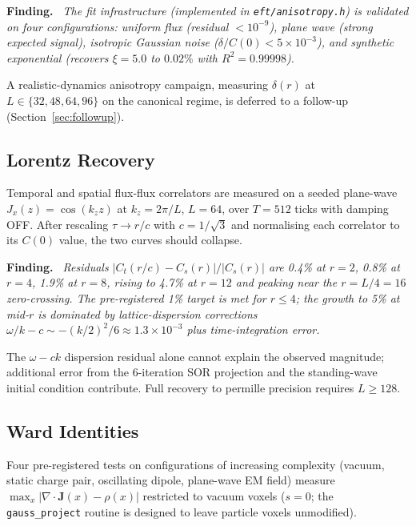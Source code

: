 \documentclass[11pt,letterpaper]{article}
\newenvironment{finding}{\par\medskip\noindent\textbf{Finding.}\itshape\ }{\par\medskip}
\begin{document}
\begin{finding}
The fit infrastructure (implemented in \texttt{eft/anisotropy.h}) is
validated on four configurations: uniform flux (residual $< 10^{-9}$),
plane wave (strong expected signal), isotropic Gaussian noise
($\delta/C(0) < 5\times 10^{-3}$), and synthetic exponential
(recovers $\xi = 5.0$ to $0.02\%$ with $R^2 = 0.99998$).
\end{finding}

A realistic-dynamics anisotropy campaign, measuring $\delta(r)$ at
$L \in \{32, 48, 64, 96\}$ on the canonical regime, is deferred to a
follow-up (Section~\ref{sec:followup}).

\subsection{Lorentz Recovery}

Temporal and spatial flux-flux correlators are measured on a seeded
plane-wave $J_x(z) = \cos(k_z z)$ at $k_z = 2\pi/L$, $L = 64$, over
$T = 512$ ticks with damping OFF. After rescaling $\tau \to r/c$ with
$c = 1/\sqrt{3}$ and normalising each correlator to its $C(0)$ value,
the two curves should collapse.

\begin{finding}
Residuals $|C_t(r/c) - C_s(r)| / |C_s(r)|$ are 0.4\% at
$r = 2$, 0.8\% at $r = 4$, 1.9\% at $r = 8$,
rising to 4.7\% at $r = 12$ and peaking near the
$r = L/4 = 16$ zero-crossing. The pre-registered 1\%
target is met for $r \leq 4$; the growth to 5\% at
mid-$r$ is dominated by lattice-dispersion corrections
$\omega / k - c \sim -(k/2)^2/6 \approx 1.3 \times 10^{-3}$
plus time-integration error.
\end{finding}

The $\omega - c k$ dispersion residual alone cannot explain the observed
magnitude; additional error from the 6-iteration SOR projection and the
standing-wave initial condition contribute. Full recovery to permille
precision requires $L \geq 128$.

\subsection{Ward Identities}

Four pre-registered tests on configurations of increasing complexity
(vacuum, static charge pair, oscillating dipole, plane-wave EM field)
measure $\max_x |\nabla \cdot \mathbf{J}(x) - \rho(x)|$ restricted to
vacuum voxels ($s = 0$; the \texttt{gauss\_project} routine is designed
to leave particle voxels unmodified).
\end{document}
